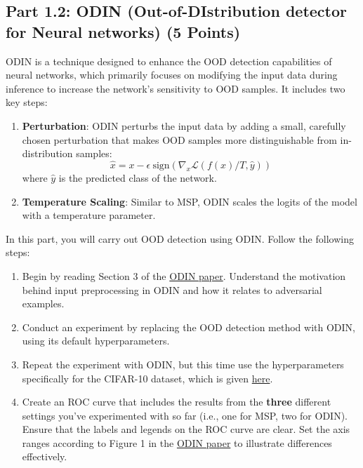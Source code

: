 \documentclass[11pt, oneside]{article}   	%
\begin{document}
\subsection*{Part 1.2: ODIN (Out-of-DIstribution detector for Neural networks) (5 Points)}
ODIN is a technique designed to enhance the OOD detection capabilities of neural networks, which primarily focuses on modifying the input data during inference to increase the network's sensitivity to OOD samples. It includes two key steps:
\begin{enumerate}
    \item  \textbf{Perturbation}: ODIN perturbs the input data by adding a small, carefully chosen perturbation that makes OOD samples more distinguishable from in-distribution samples:
    $$\hat{x} = x - \epsilon \ \text{sign}(\nabla_x \mathcal{L}(f(x) / T, \hat{y}))$$
    where $\hat{y}$ is the predicted class of the network.
    \item \textbf{Temperature Scaling}: Similar to MSP, ODIN scales the logits of the model with a temperature parameter. 
\end{enumerate}

In this part, you will carry out OOD detection using ODIN. Follow the following steps:
\begin{enumerate}
    \item Begin by reading Section 3 of the \href{https://arxiv.org/pdf/1706.02690.pdf}{ODIN paper}. Understand the motivation behind input preprocessing in ODIN and how it relates to adversarial examples.
    \item Conduct an experiment by replacing the OOD detection method with ODIN, using its default hyperparameters.
    \item Repeat the experiment with ODIN, but this time use the hyperparameters specifically for the CIFAR-10 dataset, which is given \href{https://pytorch-ood.readthedocs.io/en/latest/auto_examples/benchmarks/interface/cifar10_odin.html}{here}.
    \item Create an ROC curve that includes the results from the \textbf{three} different settings you've experimented with so far (i.e., one for MSP, two for ODIN). Ensure that the labels and legends on the ROC curve are clear. Set the axis ranges according to Figure 1 in the \href{https://arxiv.org/pdf/1706.02690.pdf}{ODIN paper} to illustrate differences effectively.
    
\end{enumerate}
\end{document}
